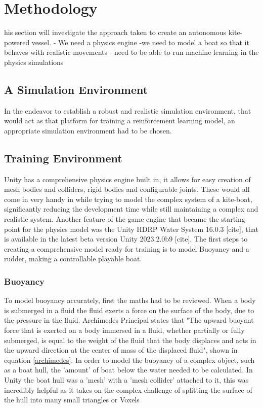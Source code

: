 
%
\let\textcircled=\pgftextcircled
\chapter{Methodology}
\label{chap:aims_and_opjectives}

his section will investigate the approach taken to create an autonomous kite-powered vessel.
- We need a physics engine
-we need to model a boat so that it behaves with realistic movements
- need to be able to run machine learning in the physics simulations

\section{A Simulation Environment}
In the endeavor to establish a robust and realistic simulation environment, that would act as that platform for training a reinforcement learning model, an appropriate simulation environment had to be chosen.  

\section{Training Environment}
Unity has a comprehensive physics engine built in, it allows for easy creation of mesh bodies and colliders, rigid bodies and configurable joints. These would all come in very handy in while trying to model the complex system of a kite-boat, significantly reducing the development time while still maintaining a complex and realistic system. Another feature of the game engine that became the starting point for the physics model was the Unity HDRP Water System 16.0.3 [cite], that is available in the latest beta version Unity 2023.2.0b9 [cite]. The first steps to creating a comprehensive model ready for training is to model Buoyancy and a rudder, making a controllable playable boat.

\subsection{Buoyancy}
To model buoyancy accurately, first the maths had to be reviewed. When a body is submerged in a fluid the fluid exerts a force on the surface of the body, due to the pressure in the fluid. Archimedes Principal states that "The upward buoyant force that is exerted on a body immersed in a fluid, whether partially or fully submerged, is equal to the weight of the fluid that the body displaces and acts in the upward direction at the center of mass of the displaced fluid", shown in equation \ref{archimedes}. In order to model the buoyancy of a complex object, such as a boat hull, the 'amount' of boat below the water needed to be calculated. In Unity the boat hull was a 'mesh' with a 'mesh collider' attached to it, this was incredibly helpful as it takes on the complex challenge of splitting the surface of the hull into many small triangles or Voxels 

